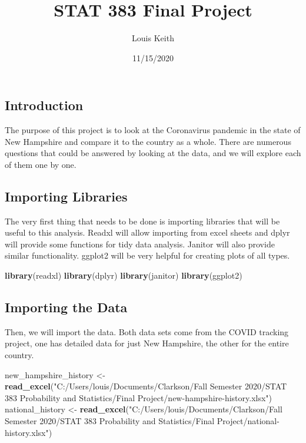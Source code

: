 \documentclass[
]{article}
\title{STAT 383 Final Project}
\author{Louis Keith}
\date{11/15/2020}
\newenvironment{Shaded}{\begin{snugshade}}{\end{snugshade}}
\newcommand{\KeywordTok}[1]{\textcolor[rgb]{0.13,0.29,0.53}{\textbf{#1}}}
\newcommand{\NormalTok}[1]{#1}
\newcommand{\StringTok}[1]{\textcolor[rgb]{0.31,0.60,0.02}{#1}}
\begin{document}
\maketitle

\hypertarget{introduction}{%
\subsection{Introduction}\label{introduction}}

The purpose of this project is to look at the Coronavirus pandemic in
the state of New Hampshire and compare it to the country as a whole.
There are numerous questions that could be answered by looking at the
data, and we will explore each of them one by one.

\hypertarget{importing-libraries}{%
\subsection{Importing Libraries}\label{importing-libraries}}

The very first thing that needs to be done is importing libraries that
will be useful to this analysis. Readxl will allow importing from excel
sheets and dplyr will provide some functions for tidy data analysis.
Janitor will also provide similar functionality. ggplot2 will be very
helpful for creating plots of all types.

\begin{Shaded}
\begin{Highlighting}[]
\KeywordTok{library}\NormalTok{(readxl)}
\KeywordTok{library}\NormalTok{(dplyr)}
\KeywordTok{library}\NormalTok{(janitor)}
\KeywordTok{library}\NormalTok{(ggplot2)}
\end{Highlighting}
\end{Shaded}

\hypertarget{importing-the-data}{%
\subsection{Importing the Data}\label{importing-the-data}}

Then, we will import the data. Both data sets come from the COVID
tracking project, one has detailed data for just New Hampshire, the
other for the entire country.

\begin{Shaded}
\begin{Highlighting}[]
\NormalTok{new_hampshire_history <-}\StringTok{ }\KeywordTok{read_excel}\NormalTok{(}\StringTok{"C:/Users/louis/Documents/Clarkson/Fall Semester 2020/STAT 383 Probability and Statistics/Final Project/new-hampshire-history.xlsx"}\NormalTok{)}
\NormalTok{national_history <-}\StringTok{ }\KeywordTok{read_excel}\NormalTok{(}\StringTok{"C:/Users/louis/Documents/Clarkson/Fall Semester 2020/STAT 383 Probability and Statistics/Final Project/national-history.xlsx"}\NormalTok{)}
\end{Highlighting}
\end{Shaded}
\end{document}

